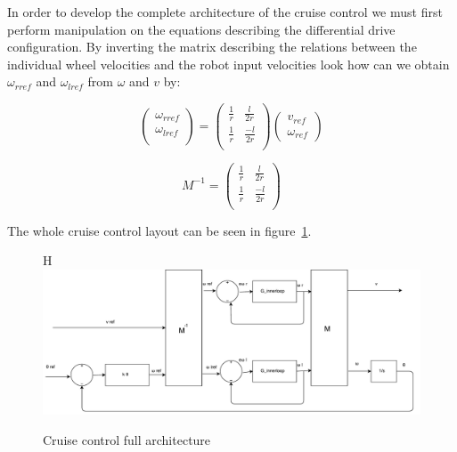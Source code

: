 In order to develop the complete architecture of the cruise control we must first perform manipulation on the equations describing the differential drive configuration. By inverting  the matrix describing the relations between the individual wheel velocities and the robot input velocities  look how can we obtain $\omega_{rref}$ and $\omega_{lref}$ from $\omega$ and $v$ by:

\begin{equation} \label{eq66}
 \begin{pmatrix} 
 \omega_{rref} \\ 
 \omega_{lref} \\
 \end{pmatrix} 
 =
 \begin{pmatrix}  
 \frac{1}{r}   & \frac{l}{2r} \\ 
 \frac{1}{r} & \frac{-l}{2r} \\ 
 \end{pmatrix}
 \begin{pmatrix} 
 v_{ref} \\ 
 \omega_{ref}
 \end{pmatrix} 
 \end{equation} 

\begin{equation} \label{eq67}
M^{-1}
=
\begin{pmatrix}  
 \frac{1}{r}   & \frac{l}{2r} \\ 
 \frac{1}{r} & \frac{-l}{2r} \\ 
 \end{pmatrix} 
\end{equation}

The whole cruise control layout can be seen in figure~\ref{fig:cruisecontrol}.

\begin{figure}{H}
\centering
 	\includegraphics[width=1\textwidth]{figures/cruisecontrol.pdf}
	\caption{Cruise control full architecture} 
 	\label{fig:cruisecontrol} 
\end{figure}


